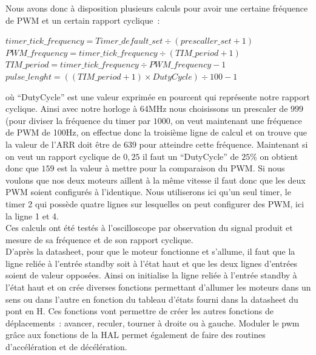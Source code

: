 \documentclass{article}
\begin{document}
Nous avons donc à disposition plusieurs calculs pour avoir une certaine fréquence de PWM et un certain rapport cyclique~: \\

\begin{center}
  $timer\_tick\_frequency = Timer\_default\_set \div ( prescaller\_set + 1 )$ \\
  $PWM\_frequency = timer\_tick\_frequency \div ( TIM\_period + 1 ) $ \\
  $TIM\_period = timer\_tick\_frequency \div PWM\_frequency - 1 $ \\
  $pulse\_lenght = ((TIM\_period + 1) \times DutyCycle) \div 100 - 1$ \\
\end{center} 

où ``DutyCycle'' est une valeur exprimée en pourcent qui représente notre rapport cyclique. Ainsi avec notre horloge à 64MHz nous choisissons un prescaler de $999$ (pour diviser la fréquence du timer par $1000$, on veut maintenant une fréquence de PWM de 100Hz, on effectue donc la troisième ligne de calcul et on trouve que la valeur de l'ARR doit être de $639$ pour atteindre cette fréquence. Maintenant si on veut un rapport cyclique de $0,25$ il faut un ``DutyCycle'' de $25\%$ on obtient donc que $159$ est la valeur à mettre pour la comparaison du PWM. Si nous voulons que nos deux moteurs aillent à la même vitesse il faut donc que les deux PWM soient configurés à l'identique. Nous utiliserons ici qu'un seul timer, le timer 2 qui possède quatre lignes sur lesquelles on peut configurer des PWM, ici la ligne 1 et 4. \\

Ces calculs ont été testés à l’oscilloscope par observation du signal produit et mesure de sa fréquence et de son rapport cyclique. \\

D'après la datasheet, pour que le moteur fonctionne et s'allume, il faut que la ligne reliée à l'entrée standby soit à l'état haut et que les deux lignes d'entrées soient de valeur opposées. Ainsi on initialise la ligne reliée à l'entrée standby à l'état haut et on crée diverses fonctions permettant d'allumer les moteurs dans un sens ou dans l'autre en fonction du tableau d'états fourni dans la datasheet du pont en H. Ces fonctions vont permettre de créer les autres fonctions de déplacements~: avancer, reculer, tourner à droite ou à gauche. Moduler le pwm grâce aux fonctions de la HAL permet également de faire des routines d'accélération et de décélération.
\end{document}
